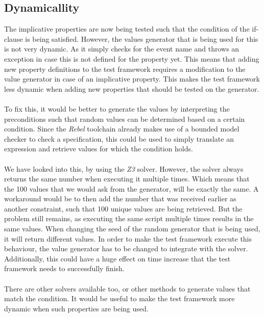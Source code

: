 \subsection*{Dynamicallity}
The implicative properties are now being tested such that the condition of the
if-clause is being satisfied. However, the values generator that is being used
for this is not very dynamic. As it simply checks for the event name and throws
an exception in case this is not defined for the property yet. This means that
adding new property definitions to the test framework requires a modification to
the value generator in case of an implicative property. This makes the test
framework less dynamic when adding new properties that should be tested on the
generator.\\
\\
To fix this, it would be better to generate the values by interpreting the
preconditions such that random values can be determined based on a certain
condition. Since the \textit{Rebel} toolchain already makes use of a bounded
model checker to check a specification, this could be used to simply translate
an expression and retrieve values for which the condition holds.\\
\\
We have looked into this, by using the \textit{Z3} solver. However, the solver
always returns the same number when executing it multiple times. Which means
that the 100 values that we would ask from the generator, will be exactly the
same. A workaround would be to then add the number that was received earlier as
another constraint, such that 100 unique values are being retrieved. But the
problem still remains, as executing the same script multiple times results in
the same values. When changing the seed of the random generator that is being
used, it will return different values. In order to make the test framework
execute this behaviour, the value generator has to be changed to integrate with
the solver. Additionally, this could have a huge effect on time increase that
the test framework needs to successfully finish.\\
\\
There are other solvers available too, or other methods to generate values that
match the condition. It would be useful to make the test framework more dynamic
when such properties are being used.

